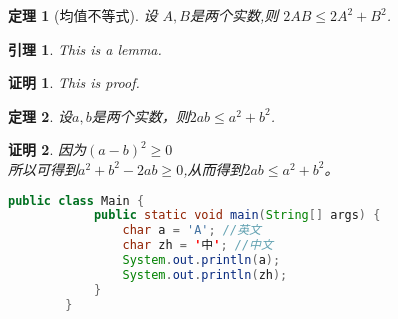 \documentclass[11pt,a4paper]{book}
\theoremstyle{break}
\newtheorem*{theorem}{定理}
\newtheorem*{lemma}{引理}
\newtheorem*{myproof}{证明}
\begin{document}
	\begin{theorem}[均值不等式]
		设 $A,B$是两个实数,则 $2AB\leq 2 A^2+B^2$.
	\end{theorem}
	
	\begin{lemma}
		This is a lemma.
	\end{lemma}
	
	\begin{myproof}
		This is proof.
	\end{myproof}
	
	\setlength{\parindent}{2em}
	\begin{theorem}
	  设$a,b$是两个实数，则$2ab\leq a^2+b^2$.
	\end{theorem}
	\begin{myproof}
	  因为$(a-b)^{2}\geq 0$\\
	  所以可得到$a^{2}+b^{2}-2ab\geq 0$,从而得到$2ab\leq a^2+b^2$。
	\end{myproof}
	
	\lstset{style=mystyle}
	\begin{lstlisting}[language=java]
		public class Main {
		    public static void main(String[] args) {
		        char a = 'A'; //英文
		        char zh = '中'; //中文
		        System.out.println(a);
		        System.out.println(zh);
		    }
		}
	\end{lstlisting}
\end{document}
